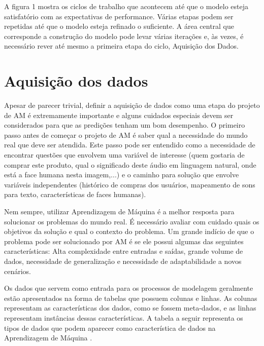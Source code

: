 A figura 1 mostra os ciclos de trabalho que acontecem até que o modelo esteja satisfatório com as expectativas de performance. Várias etapas podem ser repetidas até que o modelo esteja refinado o suficiente. A área central que corresponde a construção do modelo pode levar várias iterações e, às vezes, é necessário rever até mesmo a primeira etapa do ciclo, Aquisição dos Dados. 

\section{Aquisição dos dados}
Apesar de parecer trivial, definir a aquisição de dados como uma etapa do projeto de AM é extremamente importante e alguns cuidados especiais devem ser considerados para que as predições tenham um bom desempenho. O primeiro passo antes de começar o projeto de AM é saber qual a necessidade do mundo real que deve ser atendida. Este passo pode ser entendido como a necessidade de encontrar questões que envolvem uma variável de interesse (quem gostaria de comprar este produto, qual o significado deste áudio em linguagem natural, onde está a face humana nesta imagem,...) e o caminho para solução que envolve variáveis independentes (histórico de compras dos usuários, mapeamento de sons para texto, características de faces humanas).

Nem sempre, utilizar Aprendizagem de Máquina é a melhor resposta para solucionar os problemas do mundo real. É necessário avaliar com cuidado quais os objetivos da solução e qual o contexto do problema. Um grande indício de que o problema pode ser solucionado por AM é se ele possui algumas das seguintes características: Alta complexidade entre entradas e saídas, grande volume de dados, necessidade de generalização e necessidade de adaptabilidade a novos cenários. 

Os dados que servem como entrada para os processos de modelagem geralmente estão apresentados na forma de tabelas que possuem colunas e linhas. As colunas representam as características dos dados, como se fossem meta-dados, e as linhas representam instâncias dessas características. A tabela a seguir representa os tipos de dados que podem aparecer como característica de dados na Aprendizagem de Máquina \cite{guy2010}.

